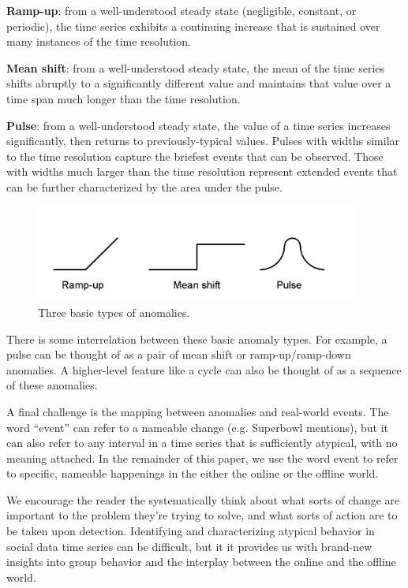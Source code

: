 \documentclass{article}
\begin{document}
\textbf{Ramp-up}: from a well-understood steady state (negligible, constant, or
periodic), the time series exhibits a continuing increase that is sustained
over many instances of the time resolution. 

\textbf{Mean shift}: from a well-understood steady state, the mean of the time
series shifts abruptly to a significantly different value and maintains that
value over a time span much longer than the time resolution. 

\textbf{Pulse}: from a well-understood steady state, the value of a time series
increases significantly, then returns to previously-typical values.
Pulses with widths similar to the time resolution capture the briefest
events that can be observed. Those with widths much larger than 
the time resolution represent extended events that can be further
characterized by the area under the pulse.

\begin{figure}[h]
\begin{center}
\includegraphics[width=0.95\textwidth]{fig/anomalies.png}
\caption{Three basic types of anomalies.}
\label{fig:anomalies}
\end{center}
\end{figure}

There is some interrelation between these basic anomaly types. For example, a
pulse can be thought of as a pair of mean shift or ramp-up/ramp-down anomalies.
A higher-level feature like a cycle can also be thought of as a sequence of
these anomalies. 
    
A final challenge is the mapping between anomalies and real-world events. The
word ``event'' can refer to a nameable change (e.g. Superbowl mentions), but it can
also refer to any interval in a time series that is sufficiently atypical, with
no meaning attached. In the remainder of this paper, we use the word event to
refer to specific, nameable happenings in the either the online or the offline world. 

We encourage the reader the systematically think about what sorts of change
are important to the problem they’re trying to solve, and what sorts of
action are to be taken upon detection. Identifying and characterizing
atypical behavior in social data time series can be difficult, but it it
provides us with brand-new insights into group behavior and the interplay
between the online and the offline world.  
\end{document}
